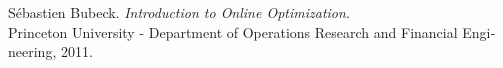
\begin{thebibliography}{9}
\begin{latin}

S\'ebastien Bubeck. 
\textit{Introduction to Online Optimization}.\\
Princeton University - Department of Operations Research and Financial Engineering, 2011.

 

\end{latin}
\end{thebibliography}